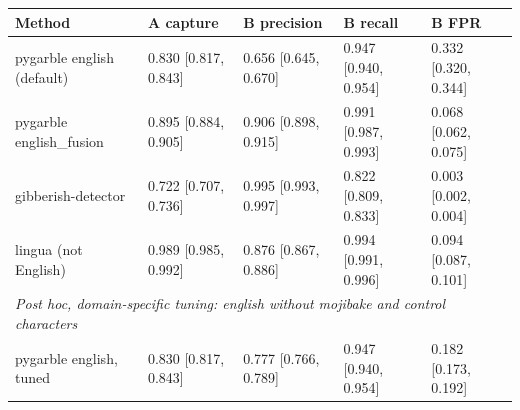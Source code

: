 \begin{tabular}{p{4.6cm}llll}
\toprule
Method & A capture & B precision & B recall & B FPR \\
\midrule
pygarble english (default) & 0.830 {\scriptsize [0.817, 0.843]} & 0.656 {\scriptsize [0.645, 0.670]} & 0.947 {\scriptsize [0.940, 0.954]} & 0.332 {\scriptsize [0.320, 0.344]} \\
pygarble english\_fusion & 0.895 {\scriptsize [0.884, 0.905]} & 0.906 {\scriptsize [0.898, 0.915]} & 0.991 {\scriptsize [0.987, 0.993]} & 0.068 {\scriptsize [0.062, 0.075]} \\
gibberish-detector & 0.722 {\scriptsize [0.707, 0.736]} & 0.995 {\scriptsize [0.993, 0.997]} & 0.822 {\scriptsize [0.809, 0.833]} & 0.003 {\scriptsize [0.002, 0.004]} \\
lingua (not English) & 0.989 {\scriptsize [0.985, 0.992]} & 0.876 {\scriptsize [0.867, 0.886]} & 0.994 {\scriptsize [0.991, 0.996]} & 0.094 {\scriptsize [0.087, 0.101]} \\
\midrule
\multicolumn{5}{l}{\emph{Post hoc, domain-specific tuning: english without mojibake and control characters}} \\
pygarble english, tuned & 0.830 {\scriptsize [0.817, 0.843]} & 0.777 {\scriptsize [0.766, 0.789]} & 0.947 {\scriptsize [0.940, 0.954]} & 0.182 {\scriptsize [0.173, 0.192]} \\
\bottomrule
\end{tabular}
